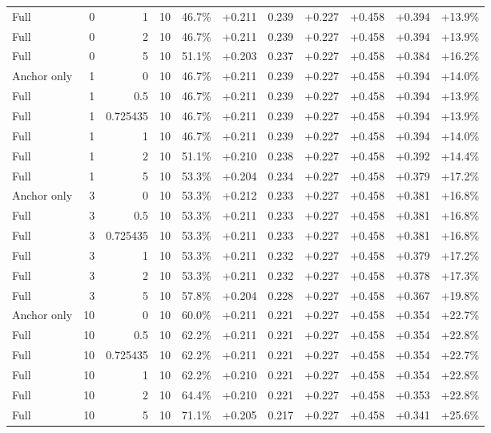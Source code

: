 \begin{table}[htbp]
\begin{tabular}{lrrrccccccc}
Full & 0 & 1 & 10 & 46.7\% & +0.211 & 0.239 & +0.227 & +0.458 & +0.394 & +13.9\% \\
Full & 0 & 2 & 10 & 46.7\% & +0.211 & 0.239 & +0.227 & +0.458 & +0.394 & +13.9\% \\
Full & 0 & 5 & 10 & 51.1\% & +0.203 & 0.237 & +0.227 & +0.458 & +0.384 & +16.2\% \\
Anchor only & 1 & 0 & 10 & 46.7\% & +0.211 & 0.239 & +0.227 & +0.458 & +0.394 & +14.0\% \\
Full & 1 & 0.5 & 10 & 46.7\% & +0.211 & 0.239 & +0.227 & +0.458 & +0.394 & +13.9\% \\
Full & 1 & 0.725435 & 10 & 46.7\% & +0.211 & 0.239 & +0.227 & +0.458 & +0.394 & +13.9\% \\
Full & 1 & 1 & 10 & 46.7\% & +0.211 & 0.239 & +0.227 & +0.458 & +0.394 & +14.0\% \\
Full & 1 & 2 & 10 & 51.1\% & +0.210 & 0.238 & +0.227 & +0.458 & +0.392 & +14.4\% \\
Full & 1 & 5 & 10 & 53.3\% & +0.204 & 0.234 & +0.227 & +0.458 & +0.379 & +17.2\% \\
Anchor only & 3 & 0 & 10 & 53.3\% & +0.212 & 0.233 & +0.227 & +0.458 & +0.381 & +16.8\% \\
Full & 3 & 0.5 & 10 & 53.3\% & +0.211 & 0.233 & +0.227 & +0.458 & +0.381 & +16.8\% \\
Full & 3 & 0.725435 & 10 & 53.3\% & +0.211 & 0.233 & +0.227 & +0.458 & +0.381 & +16.8\% \\
Full & 3 & 1 & 10 & 53.3\% & +0.211 & 0.232 & +0.227 & +0.458 & +0.379 & +17.2\% \\
Full & 3 & 2 & 10 & 53.3\% & +0.211 & 0.232 & +0.227 & +0.458 & +0.378 & +17.3\% \\
Full & 3 & 5 & 10 & 57.8\% & +0.204 & 0.228 & +0.227 & +0.458 & +0.367 & +19.8\% \\
Anchor only & 10 & 0 & 10 & 60.0\% & +0.211 & 0.221 & +0.227 & +0.458 & +0.354 & +22.7\% \\
Full & 10 & 0.5 & 10 & 62.2\% & +0.211 & 0.221 & +0.227 & +0.458 & +0.354 & +22.8\% \\
Full & 10 & 0.725435 & 10 & 62.2\% & +0.211 & 0.221 & +0.227 & +0.458 & +0.354 & +22.7\% \\
Full & 10 & 1 & 10 & 62.2\% & +0.210 & 0.221 & +0.227 & +0.458 & +0.354 & +22.8\% \\
Full & 10 & 2 & 10 & 64.4\% & +0.210 & 0.221 & +0.227 & +0.458 & +0.353 & +22.8\% \\
Full & 10 & 5 & 10 & 71.1\% & +0.205 & 0.217 & +0.227 & +0.458 & +0.341 & +25.6\% \\

\end{tabular}
\end{table}
